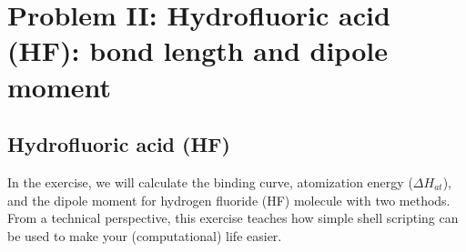 \section{Problem II: Hydrofluoric acid (HF): bond length and dipole moment} \label{sec:problemII}

\subsection*{Hydrofluoric acid (HF)}

In the exercise, we will calculate the binding curve, atomization energy ($\Delta H_{at}$), and the dipole moment for hydrogen fluoride (HF) molecule with two methods. 
From a technical perspective, this exercise teaches how simple shell scripting can be used to make your (computational) life easier. 

%
\noindent

